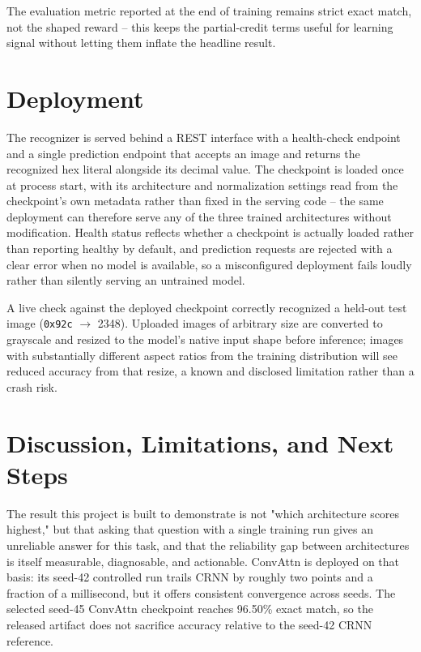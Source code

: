 \documentclass[10pt]{article}
\begin{document}
The evaluation metric reported at the end of training remains strict exact match, not
the shaped reward -- this keeps the partial-credit terms useful for learning signal
without letting them inflate the headline result.

\clearpage
\section{Deployment}

The recognizer is served behind a REST interface with a health-check endpoint and a
single prediction endpoint that accepts an image and returns the recognized hex literal
alongside its decimal value. The checkpoint is loaded once at process start, with its
architecture and normalization settings read from the checkpoint's own metadata rather
than fixed in the serving code -- the same deployment can therefore serve any of the
three trained architectures without modification. Health status reflects whether a
checkpoint is actually loaded rather than reporting healthy by default, and prediction
requests are rejected with a clear error when no model is available, so a misconfigured
deployment fails loudly rather than silently serving an untrained model.

A live check against the deployed checkpoint correctly recognized a held-out test
image (\texttt{0x92c} $\rightarrow$ 2348). Uploaded images of arbitrary size are
converted to grayscale and resized to the model's native input shape before inference;
images with substantially different aspect ratios from the training distribution will
see reduced accuracy from that resize, a known and disclosed limitation rather than a
crash risk.

\section{Discussion, Limitations, and Next Steps}

The result this project is built to demonstrate is not "which architecture scores
highest," but that asking that question with a single training run gives an unreliable
answer for this task, and that the reliability gap between architectures is itself
measurable, diagnosable, and actionable. ConvAttn is deployed on that basis: its
seed-42 controlled run trails CRNN by roughly two points and a fraction of a millisecond,
but it offers consistent convergence across seeds. The selected seed-45 ConvAttn
checkpoint reaches 96.50\% exact match, so the released artifact does not sacrifice
accuracy relative to the seed-42 CRNN reference.
\end{document}
